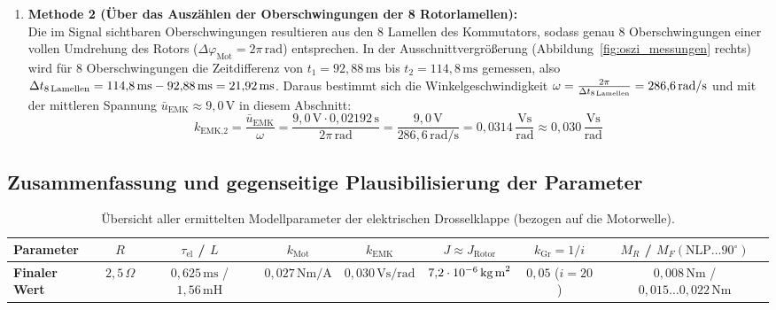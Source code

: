 \documentclass[a4paper,10pt,department=FakEI]{OTHRartcl}
\begin{document}
\begin{enumerate}
    \item \textbf{Methode 2 (Über das Auszählen der Oberschwingungen der 8 Rotorlamellen):}\\
    Die im Signal sichtbaren Oberschwingungen resultieren aus den 8 Lamellen des Kommutators, sodass genau 8 Oberschwingungen einer vollen Umdrehung des Rotors ($\Delta\varphi_{\text{Mot}} = 2\pi\,\text{rad}$) entsprechen. In der Ausschnittvergrößerung (Abbildung~\ref{fig:oszi_messungen} rechts) wird für 8 Oberschwingungen die Zeitdifferenz von $t_1 = 92{,}88\,\text{ms}$ bis $t_2 = 114{,}8\,\text{ms}$ gemessen, also $\Delta t_{\text{8\,Lamellen}} = 114{,}8\,\text{ms} - 92{,}88\,\text{ms} = 21{,}92\,\text{ms}$. Daraus bestimmt sich die Winkelgeschwindigkeit $\omega = \frac{2\pi}{\Delta t_{\text{8\,Lamellen}}} = 286{,}6\,\text{rad/s}$ und mit der mittleren Spannung $\bar{u}_{\text{EMK}} \approx 9{,}0\,\text{V}$ in diesem Abschnitt:
    \begin{equation}
        k_{\text{EMK,2}} = \frac{\bar{u}_{\text{EMK}}}{\omega} = \frac{9{,}0\,\text{V} \cdot 0{,}02192\,\text{s}}{2\pi\,\text{rad}} = \frac{9{,}0\,\text{V}}{286{,}6\,\text{rad/s}} = 0{,}0314\,\frac{\text{Vs}}{\text{rad}} \approx 0{,}030\,\frac{\text{Vs}}{\text{rad}}
    \end{equation}
\end{enumerate}

\subsection{Zusammenfassung und gegenseitige Plausibilisierung der Parameter}
\begin{table}[H]
\centering
\scriptsize
\setlength{\tabcolsep}{3.5pt}
\caption{Übersicht aller ermittelten Modellparameter der elektrischen Drosselklappe (bezogen auf die Motorwelle).}
\label{tab:parameter_uebersicht}
\begin{tabular*}{\textwidth}{@{\extracolsep{\fill}}lccccccc@{}}
\toprule
\textbf{Parameter} & $R$ & $\tau_{\text{el}}$ / $L$ & $k_{\text{Mot}}$ & $k_{\text{EMK}}$ & $J \approx J_{\text{Rotor}}$ & $k_{\text{Gr}} = 1/i$ & $M_R$ / $M_F(\text{NLP}\dots 90^\circ)$ \\
\midrule
\textbf{Finaler Wert} & $2{,}5\,\Omega$ & $0{,}625\,\text{ms}$ / $1{,}56\,\text{mH}$ & $0{,}027\,\text{Nm/A}$ & $0{,}030\,\text{Vs/rad}$ & $7{,}2 \cdot 10^{-6}\,\text{kg\,m}^2$ & $0{,}05$ ($i = 20$) & $0{,}008\,\text{Nm}$ / $0{,}015\dots 0{,}022\,\text{Nm}$ \\
\bottomrule
\end{tabular*}
\end{table}
\end{document}
